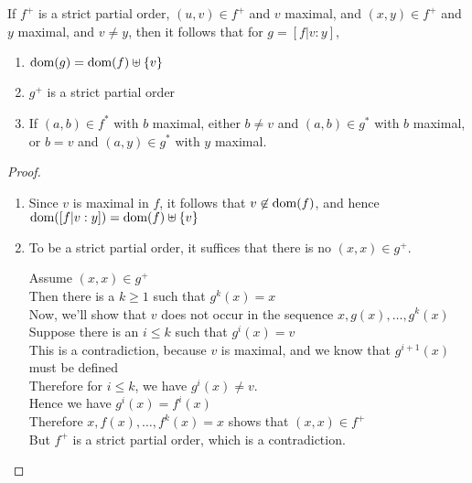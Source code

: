 \begin{lemma}
If $f^+$ is a strict partial order, $(u, v) \in f^+$ and $v$ maximal,
and $(x, y) \in f^+$ and $y$ maximal, and $v \not= y$, then it follows that for $g = [f|v:y]$,

\begin{enumerate}
\item $\mbox{dom}({g}) = \mbox{dom}({f}) \uplus \{{v}\}$
\item $g^+$ is a strict partial order 
\item If $(a,b) \in f^*$ with $b$ maximal, either $b \not= v$ and $(a,b) \in g^*$ with $b$ maximal,
  or $b = v$ and $(a,y) \in g^*$ with $y$ maximal. 
\end{enumerate}
\end{lemma}

\begin{proof}
\begin{enumerate}
\item Since $v$ is maximal in $f$, it follows that $v \not\in \mbox{dom}({f})$, and hence $\mbox{dom}({[f|v:y]}) = \mbox{dom}({f}) \uplus \{{v}\}$

\item To be a strict partial order, it suffices that there is no $(x,x) \in g^+$. 
\begin{tabbedproof}
\oo Assume $(x, x) \in g^+$ \\
\oo Then there is a $k \geq 1$ such that $g^k(x) = x$ \\
\oo Now, we'll show that $v$ does not occur in the sequence $x, g(x), \ldots, g^k(x)$ \\
\ooo Suppose there is an $i \leq k$ such that $g^i(x) = v$ \\
\ooo This is a contradiction, because $v$ is maximal, and we know that $g^{i+1}(x)$ must be defined \\
\oo Therefore for $i \leq k$, we have $g^i(x) \not= v$.  \\
\oo Hence we have $g^i(x) = f^i(x)$ \\
\oo Therefore $x, f(x), \ldots, f^k(x) = x$ shows that $(x, x) \in f^+$ \\
\oo But $f^+$ is a strict partial order, which is a contradiction. \\
\end{tabbedproof}


\end{enumerate}
\end{proof}
